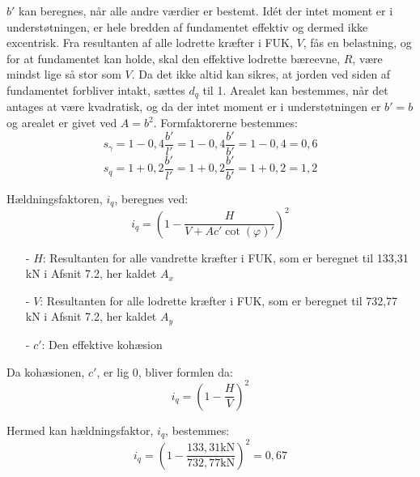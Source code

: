 $b'$ kan beregnes, når alle andre værdier er bestemt.
\newline
\newline
Idét der intet moment er i understøtningen, er hele bredden af fundamentet effektiv og dermed ikke excentrisk. Fra resultanten af alle lodrette kræfter i FUK, $V$, fås en belastning, og for at fundamentet kan holde, skal den effektive lodrette bæreevne, $R$, være mindst lige så stor som $V$.
\newline
\newline
Da det ikke altid kan sikres, at jorden ved siden af fundamentet forbliver intakt, sættes $d_q$ til 1.
\newline
\newline
Arealet kan bestemmes, når det antages at være kvadratisk, og da der intet moment er i understøtningen er $b'=b$ og arealet er givet ved $A=b^2$.
\newline
\newline
Formfaktorerne bestemmes:
\begin{equation}
	s_\gamma = 1 - 0,\!4 \frac{b'}{l'} = 1 - 0,\!4  \frac{b'}{b'} = 1 - 0,\!4 = 0,\!6
\end{equation}
\begin{equation}
	s_q = 1 + 0,\!2 \frac{b'}{l'} = 1 + 0,\!2 \frac{b'}{b'} = 1 + 0,\!2 = 1,\!2
\end{equation}

Hældningsfaktoren, $i_q$, beregnes ved:
\begin{equation}
	i_q = (1 - \frac{H}{V + A c' \cot(\varphi)'})^2
\end{equation}

\begin{itemize}
	\item[-] $H$: Resultanten for alle vandrette kræfter i FUK, som er beregnet til 133,31 kN i Afsnit 7.2, her kaldet $A_x$
	\item[-] $V$: Resultanten for alle lodrette kræfter i FUK, som er beregnet til 732,77 kN i Afsnit 7.2, her kaldet $A_y$
	\item[-] $c'$: Den effektive kohæsion
\end{itemize}

Da kohæsionen, $c'$, er lig 0, bliver formlen da:
\begin{equation}
	i_q = (1 - \frac{H}{V})^2
\end{equation}

Hermed kan hældningsfaktor, $i_q$, bestemmes:
\begin{equation}
	i_q = (1 - \frac{133,\!31 \text{kN}}{732,\!77 \text{kN}})^2 = 0,\!67
\end{equation}

